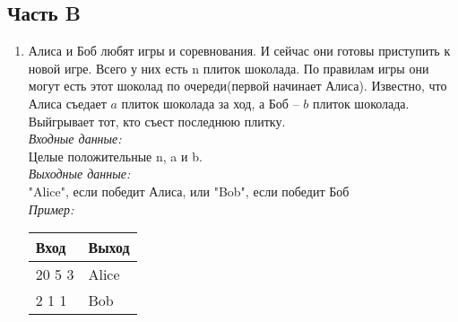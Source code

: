 \documentclass[12pt]{article}
\begin{document}
\subsection*{Часть B}
\begin{enumerate}
\item Алиса и Боб любят игры и соревнования. И сейчас они готовы приступить к новой игре. Всего у них есть n плиток шоколада. По правилам игры они могут есть этот шоколад по очереди(первой начинает Алиса). Известно, что Алиса съедает $a$ плиток шоколада за ход, а Боб -- $b$ плиток шоколада. Выйгрывает тот, кто съест последнюю плитку. \\
\null\hspace{1cm}\textit{Входные данные:} \\
\null\hspace{2cm} Целые положительные n, a и b. \\
\null\hspace{1cm} \textit{Выходные данные:} \\
\null\hspace{2cm} "Alice", если победит Алиса, или "Bob", если победит Боб \\
\null\hspace{1cm} \textit{Пример:}
\begin{table}[h]
\centering
\begin{tabular}{|l|l|}
\hline
Вход & Выход                                                      \\ \hline
20 5 3  & Alice  \\ \hline
2 1 1  & Bob                                                        \\ \hline
\end{tabular}
\end{table}


\end{enumerate}
\end{document}
